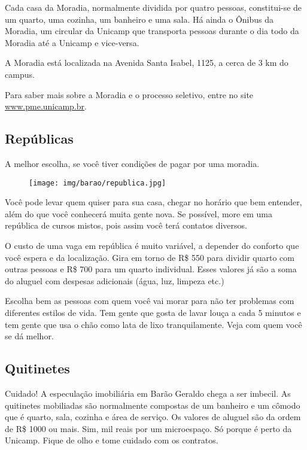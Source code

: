 Cada casa da Moradia, normalmente dividida por quatro pessoas, constitui-se de
um quarto, uma cozinha, um banheiro e uma sala. Há ainda o Ônibus da Moradia, um
circular da Unicamp que transporta pessoas durante o dia todo da Moradia até a
Unicamp e vice-versa.

A Moradia está localizada na Avenida Santa Isabel, 1125, a cerca de 3 km do
campus.

Para saber mais sobre a Moradia e o processo seletivo, entre no site
\url{www.pme.unicamp.br}.

\subsection{Repúblicas}

A melhor escolha, se você tiver condições de pagar por uma moradia.

\begin{figure}[h!]
    \centering
    \texttt{[image: img/barao/republica.jpg]}
\end{figure}

Você pode levar quem quiser para sua casa, chegar no horário que bem entender,
além do que você conhecerá muita gente nova. Se possível, more em uma república
de cursos mistos, pois assim você terá contatos diversos.

O custo de uma vaga em república é muito variável, a depender do conforto que
você espera e da localização. Gira em torno de R\$ 550 para dividir quarto com
outras pessoas e R\$ 700 para um quarto individual. Esses valores já são a soma
do aluguel com despesas adicionais (água, luz, limpeza etc.)

Escolha bem as pessoas com quem você vai morar para não ter problemas com
diferentes estilos de vida. Tem gente que gosta de lavar louça a cada 5 minutos
e tem gente que usa o chão como lata de lixo tranquilamente. Veja com quem você
se dá melhor.

\subsection{Quitinetes}

Cuidado! A especulação imobiliária em Barão Geraldo chega a ser imbecil. As
quitinetes mobiliadas são normalmente compostas de um banheiro e um cômodo que é
quarto, sala, cozinha e área de serviço. Os valores de aluguel são da ordem de
R\$ 1000 ou mais. Sim, mil reais por um microespaço. Só porque é perto da
Unicamp. Fique de olho e tome cuidado com os contratos.


